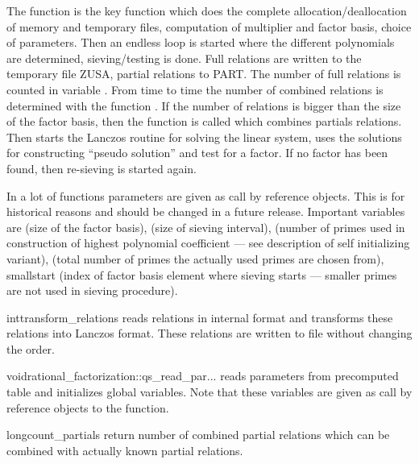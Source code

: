 \begin{techdoc}
  The function  is the key function which does the
  complete allocation/deallocation of memory and temporary files, computation of multiplier and
  factor basis, choice of parameters.  Then an endless loop is started where the different
  polynomials are determined, sieving/testing is done.  Full relations are written to the
  temporary file ZUSA, partial relations to PART.  The number of full relations is counted in
  variable .  From time to time the number of combined relations is
  determined with the function .  If the number of relations is bigger than
  the size of the factor basis, then the function  is called which combines partials
  relations.  Then  starts the Lanczos routine for solving the linear
  system, uses the solutions for constructing ``pseudo solution'' and test for a factor.  If no
  factor has been found, then re-sieving is started again.
  
  In a lot of functions parameters are given as call by reference objects.  This is for
  historical reasons and should be changed in a future release.  Important variables are
   (size of the factor basis),  (size of sieving interval), 
  (number of primes used in construction of highest polynomial coefficient --- see description
  of self initializing variant),  (total number of primes the actually used
   primes are chosen from), smallstart (index of factor basis element where sieving
  starts --- smaller primes are not used in sieving procedure).
\end{techdoc}

\begin{Tfcode}{int}{transform_relations}{}
  reads relations in internal format and transforms these relations into Lanczos format.  These
  relations are written to file  without changing the order.
\end{Tfcode}

\begin{Tfcode}{void}{rational_factorization::qs_read_par}{...}
  reads parameters from precomputed table and initializes global variables.  Note that these
  variables are given as call by reference objects to the function.
\end{Tfcode}

\begin{Tfcode}{long}{count_partials}{}
  return number of combined partial relations which can be combined with actually known partial
  relations.
\end{Tfcode}

